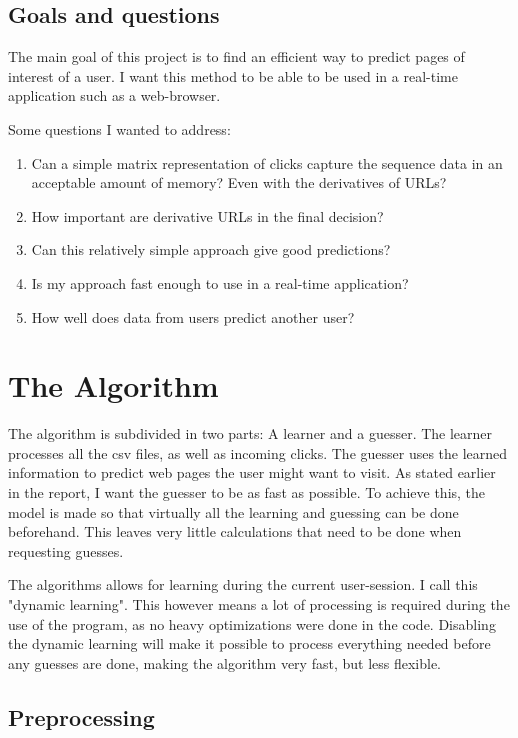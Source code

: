 \documentclass{article}
\begin{document}
\subsection{Goals and questions}

The main goal of this project is to find an efficient way to predict pages of interest of a user.
I want this method to be able to be used in a real-time application such as a web-browser.

Some questions I wanted to address:

\begin{enumerate}
  \item Can a simple matrix representation of clicks capture the sequence data in an acceptable amount of memory? Even with the derivatives of URLs?
  \item How important are derivative URLs in the final decision?
  \item Can this relatively simple approach give good predictions?
  \item Is my approach fast enough to use in a real-time application?
  \item How well does data from users predict another user?
\end{enumerate}

\section{The Algorithm}

The algorithm is subdivided in two parts: A learner and a guesser.
The learner processes all the csv files, as well as incoming clicks.
The guesser uses the learned information to predict web pages the user might want to visit.
As stated earlier in the report, I want the guesser to be as fast as possible.
To achieve this, the model is made so that virtually all the learning and guessing can be done beforehand.
This leaves very little calculations that need to be done when requesting guesses.

The algorithms allows for learning during the current user-session.
I call this "dynamic learning".
This however means a lot of processing is required during the use of the program, as no heavy optimizations were done in the code.
Disabling the dynamic learning will make it possible to process everything needed before any guesses are done, making the algorithm very fast, but less flexible.

\subsection{Preprocessing}
\end{document}
